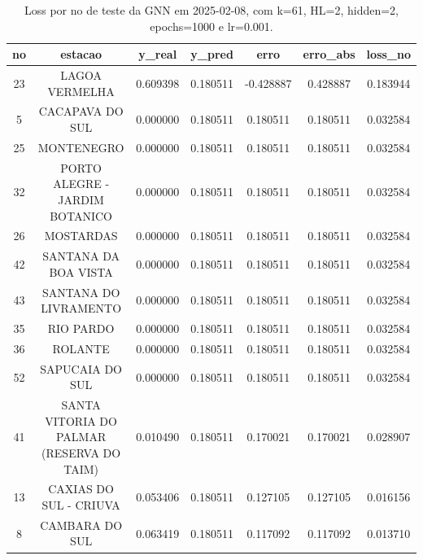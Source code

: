 \begin{table}[h]
\centering
\caption{Loss por no de teste da GNN em 2025-02-08, com k=61, HL=2, hidden=2, epochs=1000 e lr=0.001.}
\label{tab:gnn_loss_k61_hl2_h2_e1000_d20250208}
\begin{tabular}{ccccccc}
\toprule
no & estacao & y\_real & y\_pred & erro & erro\_abs & loss\_no \\
\midrule
23 & LAGOA VERMELHA & 0.609398 & 0.180511 & -0.428887 & 0.428887 & 0.183944 \\
5 & CACAPAVA DO SUL & 0.000000 & 0.180511 & 0.180511 & 0.180511 & 0.032584 \\
25 & MONTENEGRO & 0.000000 & 0.180511 & 0.180511 & 0.180511 & 0.032584 \\
32 & PORTO ALEGRE - JARDIM BOTANICO & 0.000000 & 0.180511 & 0.180511 & 0.180511 & 0.032584 \\
26 & MOSTARDAS & 0.000000 & 0.180511 & 0.180511 & 0.180511 & 0.032584 \\
42 & SANTANA DA BOA VISTA & 0.000000 & 0.180511 & 0.180511 & 0.180511 & 0.032584 \\
43 & SANTANA DO LIVRAMENTO & 0.000000 & 0.180511 & 0.180511 & 0.180511 & 0.032584 \\
35 & RIO PARDO & 0.000000 & 0.180511 & 0.180511 & 0.180511 & 0.032584 \\
36 & ROLANTE & 0.000000 & 0.180511 & 0.180511 & 0.180511 & 0.032584 \\
52 & SAPUCAIA DO SUL & 0.000000 & 0.180511 & 0.180511 & 0.180511 & 0.032584 \\
41 & SANTA VITORIA DO PALMAR (RESERVA DO TAIM) & 0.010490 & 0.180511 & 0.170021 & 0.170021 & 0.028907 \\
13 & CAXIAS DO SUL - CRIUVA & 0.053406 & 0.180511 & 0.127105 & 0.127105 & 0.016156 \\
8 & CAMBARA DO SUL & 0.063419 & 0.180511 & 0.117092 & 0.117092 & 0.013710 \\
\bottomrule
\end{tabular}
\end{table}
